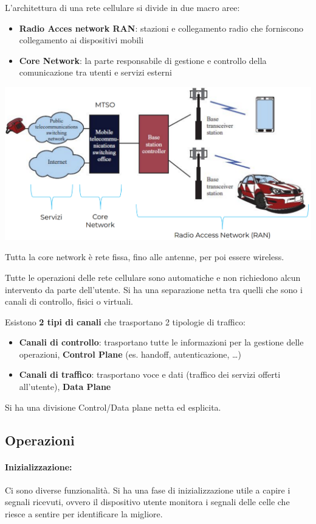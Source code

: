 L'architettura di una rete cellulare si divide in due macro aree: 
\begin{itemize}
	\item \textbf{Radio Acces network RAN}: stazioni e collegamento radio che forniscono collegamento ai dispositivi mobili

	\item \textbf{Core Network}: la parte responsabile di gestione e controllo della comunicazione tra utenti e servizi esterni
\end{itemize}
\begin{center}
	\includegraphics[width=0.8\linewidth]{img/mobile/archop}
\end{center}
Tutta la core network è rete fissa, fino alle antenne, per poi essere wireless. 

Tutte le operazioni delle rete cellulare sono automatiche e non richiedono alcun intervento da parte dell'utente. Si ha una separazione netta tra quelli che sono i canali di controllo, fisici o virtuali. 

Esistono \textbf{2 tipi di canali} che trasportano 2 tipologie di traffico:
\begin{itemize}
	\item \textbf{Canali di controllo}: trasportano tutte le informazioni per la gestione delle operazioni, \textbf{Control Plane} (es. handoff, autenticazione, \dots)

	\item \textbf{Canali di traffico}: trasportano voce e dati (traffico dei servizi offerti all'utente), \textbf{Data Plane}
\end{itemize}
Si ha una divisione Control/Data plane netta ed esplicita.

\subsection{Operazioni}

\paragraph{Inizializzazione:} Ci sono diverse funzionalità. Si ha una fase di inizializzazione utile a capire i segnali ricevuti, ovvero il dispositivo utente monitora i segnali delle celle che riesce a sentire per identificare la migliore. 

